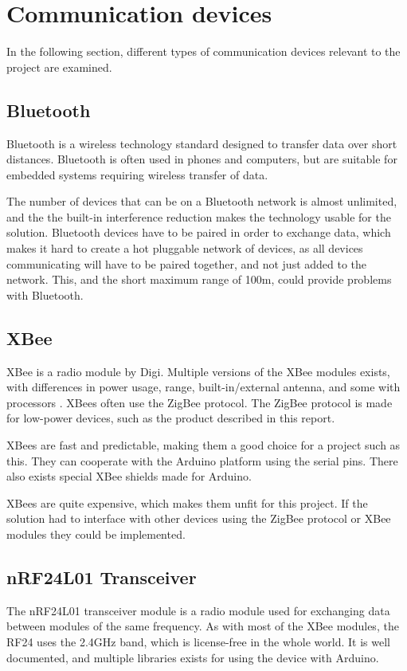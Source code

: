 \section{Communication devices}
In the following section, different types of communication devices relevant to the project are examined.

\subsection{Bluetooth}
Bluetooth is a wireless technology standard designed to transfer data over short distances\cite{bluetoothbasics}. Bluetooth is often used in phones and computers, but are suitable for embedded systems requiring wireless transfer of data.

The number of devices that can be on a Bluetooth network is almost unlimited, and the the built-in interference reduction makes the technology usable for the solution\cite{bluetoothbasics}.
Bluetooth devices have to be paired in order to exchange data, which makes it hard to create a hot pluggable network of devices, as all devices communicating will have to be paired together, and not just added to the network. 
This, and the short maximum range of 100m\cite{bluetoothbasics}, could provide problems with Bluetooth.

\subsection{XBee}
XBee is a radio module by Digi. Multiple versions of the XBee modules exists, with differences in power usage, range, built-in/external antenna, and some with processors \cite{sparkfunXbeeGuide}.
XBees often use the ZigBee protocol. The ZigBee protocol is made for low-power devices, such as the product described in this report\cite{zigbee}.

XBees are fast and predictable, making them a good choice for a project such as this. They can cooperate with the Arduino platform using the serial pins. There also exists special XBee shields made for Arduino.

XBees are quite expensive, which makes them unfit for this project. If the solution had to interface with other devices using the ZigBee protocol or XBee modules they could be implemented.

\subsection{nRF24L01 Transceiver}
The nRF24L01 transceiver module is a radio module used for exchanging data between modules of the same frequency. As with most of the XBee modules, the RF24 uses the 2.4GHz band, which is license-free in the whole world\cite{itubands}. It is well documented, and multiple libraries exists for using the device with Arduino.

